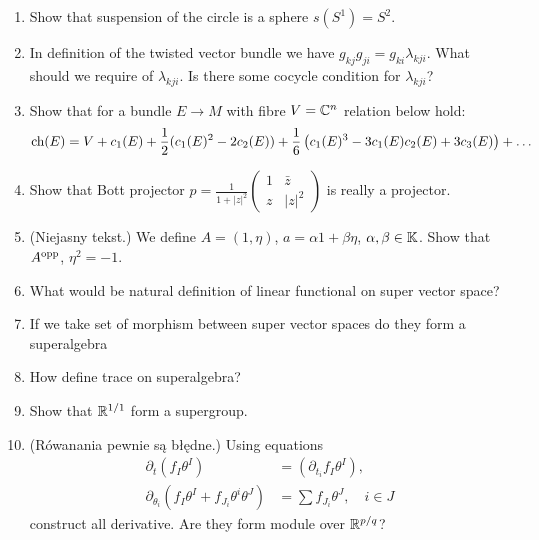 \documentclass[a4paper,11pt]{article}
\begin{document}
\begin{enumerate}
\item Show that suspension of the circle is a sphere
  $s( S^{ 1 } ) = S^{ 2 }$.

\item In definition of the twisted vector bundle we have
  $g_{ kj } g_{ ji } = g_{ ki } \lambda_{ kji }$. What should we
  require of $\lambda_{ kji }$. Is there some cocycle condition for
  $\lambda_{ kji }$?

\item Show that for a bundle $E \to M$ with fibre $V = \mathbb{C}^{ n }$
  relation below hold:
  \begin{equation}
    \label{eq:DiffGeo-11}
    \textrm{ch}( E ) =
    V + c_{ 1 }( E )
    + \frac{ 1 }{ 2 } ( c_{ 1 }( E )^{ 2 } - 2 c_{ 2 }( E ) )
    + \frac{ 1 }{ 6 } \left( c_{ 1 }( E )^{ 3 } - 3 c_{ 1 }( E ) c_{ 2 }( E )
      + 3 c_{ 3 }( E ) \right) + \ldots
  \end{equation}

\item Show that Bott projector
  $p = \frac{ 1 }{ 1 + \lvert z \rvert^{ 2 } }
  \begin{pmatrix}
    1 & \bar{z} \\
    z & \lvert z \lvert^{ 2 }
  \end{pmatrix}$ is really a projector.

\item (Niejasny tekst.) We define $A = ( 1, \eta )$,
  $a = \alpha 1 + \beta \eta$, $\alpha, \beta \in \mathbb{K}$. Show that
  $A^{ \textrm{opp} }$, $\eta^{ 2 } = -1$.

\item What would be natural definition of linear functional on super
  vector space?

\item If we take set of morphism between super vector spaces do they
  form a superalgebra

\item How define trace on superalgebra?

\item Show that $\mathbb{R}^{ 1 / 1 }$ form a supergroup.

\item (Rówanania pewnie są błędne.) Using equations
  \begin{align}
    \partial_{ t } \left( f_{ I } \theta^{ I } \right)
    &= \left( \partial_{ t_{ i } } f_{ I } \theta^{ I } \right), \\
    \partial_{ \theta_{ i } } \left( f_{ I } \theta^{ I }
    + f_{ J_{ i } } \theta^{ i } \theta^{ J } \right)
    &= \sum f_{ J_{ i } } \theta^{ J }, \quad
      i \in J
  \end{align}
  construct all derivative. Are they form module over
  $\mathbb{R}^{ p / q }$?


\end{enumerate}
\end{document}
